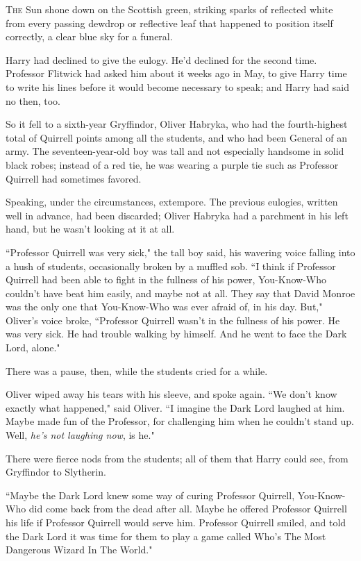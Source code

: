 
\lettrine{T}{he} Sun shone down on the Scottish green, striking sparks of reflected white from every passing dewdrop or reflective leaf that happened to position itself correctly, a clear blue sky for a funeral.

Harry had declined to give the eulogy. He'd declined for the second time. Professor Flitwick had asked him about it weeks ago in May, to give Harry time to write his lines before it would become necessary to speak; and Harry had said no then, too.

So it fell to a sixth-year Gryffindor, Oliver Habryka, who had the fourth-highest total of Quirrell points among all the students, and who had been General of an army. The seventeen-year-old boy was tall and not especially handsome in solid black robes; instead of a red tie, he was wearing a purple tie such as Professor Quirrell had sometimes favored.

Speaking, under the circumstances, extempore. The previous eulogies, written well in advance, had been discarded; Oliver Habryka had a parchment in his left hand, but he wasn't looking at it at all.

``Professor Quirrell was very sick," the tall boy said, his wavering voice falling into a hush of students, occasionally broken by a muffled sob. ``I think if Professor Quirrell had been able to fight in the fullness of his power, You-Know-Who couldn't have beat him easily, and maybe not at all. They say that David Monroe was the only one that You-Know-Who was ever afraid of, in his day. But," Oliver's voice broke, ``Professor Quirrell wasn't in the fullness of his power. He was very sick. He had trouble walking by himself. And he went to face the Dark Lord, alone."

There was a pause, then, while the students cried for a while.

Oliver wiped away his tears with his sleeve, and spoke again. ``We don't know exactly what happened," said Oliver. ``I imagine the Dark Lord laughed at him. Maybe made fun of the Professor, for challenging him when he couldn't stand up. Well, \emph{he's not laughing now}, is he."

There were fierce nods from the students; all of them that Harry could see, from Gryffindor to Slytherin.

``Maybe the Dark Lord knew some way of curing Professor Quirrell, You-Know-Who did come back from the dead after all. Maybe he offered Professor Quirrell his life if Professor Quirrell would serve him. Professor Quirrell smiled, and told the Dark Lord it was time for them to play a game called Who's The Most Dangerous Wizard In The World."

